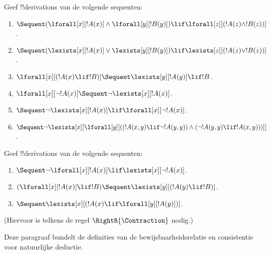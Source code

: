 \documentclass[openany]{memoir}
\begin{document}
\begin{prob}
Geef !!{derivation}s van de volgende sequenten:
\begin{enumerate}
\item $\Sequent (\lforall[x][!A(x)] \land \lforall[y][!B(y)]) \lif
\lforall[z][(!A(z) \land !B(z))]$.
\item $\Sequent (\lexists[x][!A(x)] \lor \lexists[y][!B(y)]) \lif
\lexists[z][(!A(z) \lor !B(z))]$.
\item $\lforall[x][(!A(x) \lif !B)] \Sequent \lexists[y][!A(y)] \lif !B$.
\item $\lforall[x][\lnot !A(x)] \Sequent \lnot\lexists[x][!A(x)]$.
\item $\Sequent \lnot\lexists[x][!A(x)] \lif \lforall[x][\lnot !A(x)]$.
\item $\Sequent \lnot\lexists[x][\lforall[y][((!A(x,y) \lif \lnot
!A(y,y)) \land (\lnot !A(y,y) \lif !A(x,y)))]]$.
\end{enumerate}
\end{prob}

\begin{prob}
Geef !!{derivation}s van de volgende sequenten:
\begin{enumerate}
\item $\Sequent \lnot\lforall[x][!A(x)] \lif \lexists[x][\lnot!A(x)]$.
\item $(\lforall[x][!A(x)] \lif !B) \Sequent \lexists[y][(!A(y) \lif !B)]$.
\item $\Sequent \lexists[x][(!A(x) \lif \lforall[y][!A(y)])]$.
\end{enumerate}
(Hiervoor is telkens de regel $\RightR{\Contraction}$ nodig.)
\end{prob}
\endgroup

\begingroup
\def\olfilename{OLP-0077}
\def\olfilepath{content/first-order-logic/sequent-calculus/}
\hypertarget{unit-OLP-0077}{}



\begin{editorial}
  Deze paragraaf bundelt de definities van de bewijsbaarheidsrelatie en
  consistentie voor natuurlijke deductie.
\end{editorial}
\end{document}

